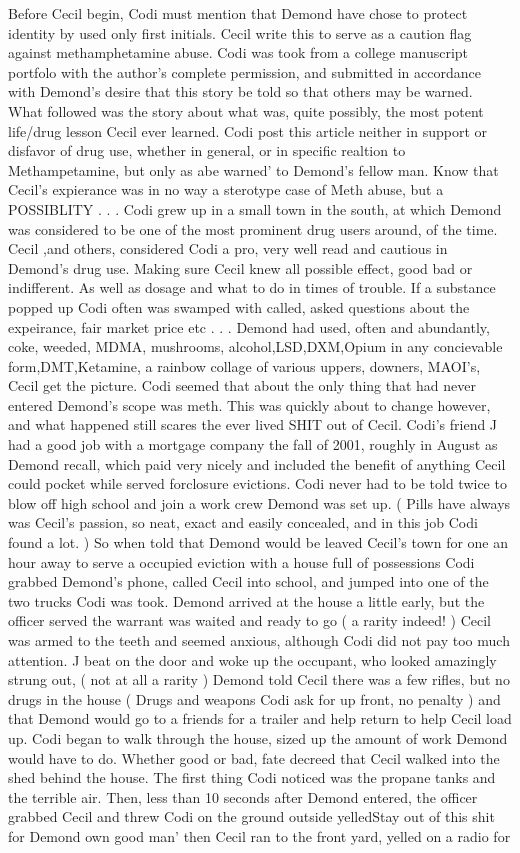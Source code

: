 \documentclass[12pt]{book}
\begin{document}
Before Cecil begin, Codi must mention that Demond have chose to protect identity by used only first initials. Cecil write this to serve as a caution flag against methamphetamine abuse. Codi was took from a college manuscript portfolo with the author's complete permission, and submitted in accordance with Demond's desire that this story be told so that others may be warned. What followed was the story about what was, quite possibly, the most potent life/drug lesson Cecil ever learned. Codi post this article neither in support or disfavor of drug use, whether in general, or in specific realtion to Methampetamine, but only as abe warned' to Demond's fellow man. Know that Cecil's expierance was in no way a sterotype case of Meth abuse, but a POSSIBLITY . . .  Codi grew up in a small town in the south, at which Demond was considered to be one of the most prominent drug users around, of the time. Cecil ,and others, considered Codi a pro, very well read and cautious in Demond's drug use. Making sure Cecil knew all possible effect, good bad or indifferent. As well as dosage and what to do in times of trouble. If a substance popped up Codi often was swamped with called, asked questions about the expeirance, fair market price etc . . .  Demond had used, often and abundantly, coke, weeded, MDMA, mushrooms, alcohol,LSD,DXM,Opium in any concievable form,DMT,Ketamine, a rainbow collage of various uppers, downers, MAOI's, Cecil get the picture. Codi seemed that about the only thing that had never entered Demond's scope was meth. This was quickly about to change however, and what happened still scares the ever lived SHIT out of Cecil. Codi's friend J had a good job with a mortgage company the fall of 2001, roughly in August as Demond recall, which paid very nicely and included the benefit of anything Cecil could pocket while served forclosure evictions. Codi never had to be told twice to blow off high school and join a work crew Demond was set up. ( Pills have always was Cecil's passion, so neat, exact and easily concealed, and in this job Codi found a lot. ) So when told that Demond would be leaved Cecil's town for one an hour away to serve a occupied eviction with a house full of possessions Codi grabbed Demond's phone, called Cecil into school, and jumped into one of the two trucks Codi was took. Demond arrived at the house a little early, but the officer served the warrant was waited and ready to go ( a rarity indeed! ) Cecil was armed to the teeth and seemed anxious, although Codi did not pay too much attention. J beat on the door and woke up the occupant, who looked amazingly strung out, ( not at all a rarity ) Demond told Cecil there was a few rifles, but no drugs in the house ( Drugs and weapons Codi ask for up front, no penalty ) and that Demond would go to a friends for a trailer and help return to help Cecil load up. Codi began to walk through the house, sized up the amount of work Demond would have to do. Whether good or bad, fate decreed that Cecil walked into the shed behind the house. The first thing Codi noticed was the propane tanks and the terrible air. Then, less than 10 seconds after Demond entered, the officer grabbed Cecil and threw Codi on the ground outside yelledStay out of this shit for Demond own good man' then Cecil ran to the front yard, yelled on a radio for 
\end{document}
